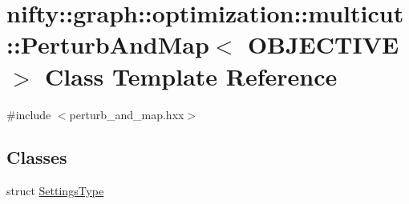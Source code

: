 \hypertarget{classnifty_1_1graph_1_1optimization_1_1multicut_1_1PerturbAndMap}{}\section{nifty\+:\+:graph\+:\+:optimization\+:\+:multicut\+:\+:Perturb\+And\+Map$<$ O\+B\+J\+E\+C\+T\+I\+V\+E $>$ Class Template Reference}
\label{classnifty_1_1graph_1_1optimization_1_1multicut_1_1PerturbAndMap}


{\ttfamily \#include $<$perturb\+\_\+and\+\_\+map.\+hxx$>$}

\subsection*{Classes}
\begin{DoxyCompactItemize}
\item 
struct \hyperlink{structnifty_1_1graph_1_1optimization_1_1multicut_1_1PerturbAndMap_1_1SettingsType}{Settings\+Type}
\end{DoxyCompactItemize}
